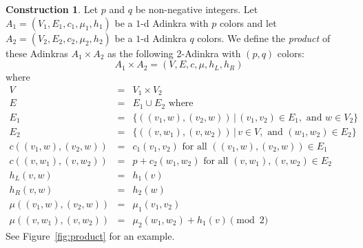 \documentclass[12pt,twoside,singlespace]{article}
\numberwithin{equation}{section}
\theoremstyle{definition}
\newtheorem{construction}[equation]{Construction}
\begin{document}
\begin{construction}
\label{const:product}
Let $p$ and $q$ be non-negative integers.  Let $A_1=(V_1, E_1, c_1, \mu_1,h_1)$ be a $1$-d Adinkra with $p$ colors and let $A_2=(V_2, E_2, c_2, \mu_2,h_2)$ be a $1$-d Adinkra $q$ colors.  We define the \emph{product} of these Adinkras $A_1\times A_2$ as the following 2-Adinkra with $(p,q)$ colors:
\[A_1\times A_2=(V,E,c,\mu,h_L,h_R)\]
where
\begin{eqnarray*}
V&=&V_1\times V_2\\
E&=&E_1\cup E_2\mbox{ where}\\
E_1&=&\{((v_1,w),(v_2,w))\,|\,(v_1, v_2)\in E_1,\mbox{ and } w\in V_2\}\\
E_2&=&\{((v,w_1),(v,w_2))\,|\,v\in V, \mbox{ and }(w_1,w_2)\in E_2\}\\
c((v_1,w),(v_2,w))&=&c_1(v_1,v_2)\mbox{ for all $((v_1,w),(v_2,w))\in E_1$}\\
c((v,w_1),(v,w_2))&=&p+c_2(w_1,w_2)\mbox{ for all $(v,w_1),(v,w_2)\in E_2$}\\
h_L(v,w)&=&h_1(v)\\
h_R(v,w)&=&h_2(w)\\
\mu((v_1,w),(v_2,w))&=&\mu_1(v_1,v_2)\\
\mu((v,w_1),(v,w_2))&=&\mu_2(w_1,w_2)+h_1(v)\pmod{2}
\end{eqnarray*}
See Figure~\ref{fig:product} for an example.
\end{construction}
\end{document}
